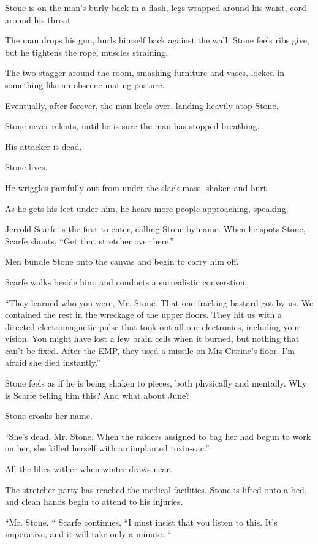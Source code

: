 Stone is on the man’s burly back in a flash, legs wrapped around his waist, cord around his throat.

The man drops his gun, hurls himself back against the wall. Stone feels ribs give, but he tightens the rope, muscles straining.

The two stagger around the room, smashing furniture and vases, locked in something like an obscene mating posture.

Eventually, after forever, the man keels over, landing heavily atop Stone.

Stone never relents, until he is sure the man has stopped breathing.

His attacker is dead.

Stone lives.

He wriggles painfully out from under the slack mass, shaken and hurt.

As he gets his feet under him, he hears more people approaching, speaking.

Jerrold Scarfe is the first to enter, calling Stone by name. When he spots Stone, Scarfe shouts, “Get that stretcher over here.”

Men bundle Stone onto the canvas and begin to carry him off.

Scarfe walks beside him, and conducts a surrealistic converstion.

“They learned who you were, Mr. Stone. That one fracking bastard got by us. We contained the rest in the wreckage of the upper floors. They hit us with a directed electromagnetic pulse that took out all our electronics, including your vision. You might have lost a few brain cells when it burned, but nothing that can’t be fixed. After the EMP, they used a missile on Miz Citrine’s floor. I’m afraid she died instantly.”

Stone feels as if he is being shaken to pieces, both physically and mentally. Why is Scarfe telling him this? And what about June?

Stone croaks her name.

“She’s dead, Mr. Stone. When the raiders assigned to bag her had begun to work on her, she killed herself with an implanted toxin-sac.”

All the lilies wither when winter draws near.

The stretcher party has reached the medical facilities. Stone is lifted onto a bed, and clean hands begin to attend to his injuries.

“Mr. Stone, “ Scarfe continues, “I must insist that you listen to this. It’s imperative, and it will take only a minute. “

